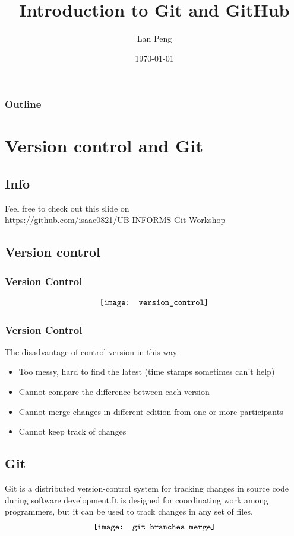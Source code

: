 \documentclass{beamer}
\title{Introduction to Git and GitHub}
\author{Lan Peng}
\institute{Department of Industrial and Systems Engineering, University at Buffalo, SUNY}
\date{\today}
\begin{document}
	\frame{\titlepage}
	
	\begin{frame}
		\frametitle{Outline}
		\tableofcontents
	\end{frame}

	\section{Version control and Git}
		\subsection{Info}
			\begin{frame}
				Feel free to check out this slide on\\
				\url{https://github.com/isaac0821/UB-INFORMS-Git-Workshop}				
			\end{frame}
		\subsection{Version control}
			\begin{frame}
				\frametitle{Version Control}
				\begin{align}
					\centering
					\texttt{[image: version\_control]} \nonumber
				\end{align}			
			\end{frame}

			\begin{frame}
				\frametitle{Version Control}
				The disadvantage of control version in this way
				\begin{itemize}
					\item Too messy, hard to find the latest (time stamps sometimes can't help)
					\item Cannot compare the difference between each version
					\item Cannot merge changes in different edition from one or more participants
					\item Cannot keep track of changes
				\end{itemize}
			\end{frame}
		\subsection{Git}
			\begin{frame}
				Git is a distributed version-control system for tracking changes in source code during software development.It is designed for coordinating work among programmers, but it can be used to track changes in any set of files.
				\begin{align}
					\centering
					\texttt{[image: git-branches-merge]} \nonumber
				\end{align}
			\end{frame}
\end{document}

